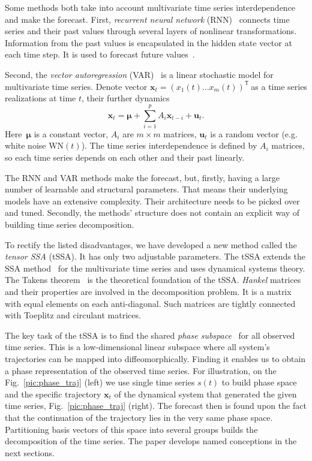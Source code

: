 \documentclass[referee, pdflatex, sn-mathphys-num]{sn-jnl}
\theoremstyle{definition}
\theoremstyle{plain}
\begin{document}
	Some methods both take into account multivariate time series interdependence and make the forecast. First, \emph{recurrent neural network} (RNN)~\cite{neco} connects time series and their past values through several layers of nonlinear transformations. Information from the past values is encapsulated in the hidden state vector at each time step. It is used to forecast future values~\cite{TEALAB2018334}.
	
	Second, the	\emph{vector autoregression} (VAR)~\cite{VAR_model1, doi:10.1080/01621459.1962.10480664} is a linear stochastic model for multivariate time series. Denote vector $ \mathbf{x}_t = (x_1(t) \ldots x_m(t))^{\mathsf{T}}~$as a time series realizations at time $ t $, their further dynamics	\begin{equation*}
		\mathbf{x}_t = \boldsymbol{\mu} + \sum\limits_{i = 1}^p A_i \mathbf{x}_{t - i} + \mathbf{u}_t.
	\end{equation*} Here~$\boldsymbol{\mu} $ is a constant vector, $A_i$ are $m \times m $ matrices, $ \mathbf{u}_t $ is a random vector (e.g. white noise $ \text{WN}(t) $). The time series interdependence is defined by $ A_i $ matrices, so each time series depends on each other and their past linearly.
	
	The RNN and VAR methods make the forecast, but, firstly, having a large number of learnable and structural parameters. That means their underlying models have an extensive complexity. Their architecture needs to be picked over and tuned. Secondly, the methods' structure does not contain an explicit way of building time series decomposition.
	
	To rectify the listed disadvantages, we have developed a new method called the \emph{tensor SSA} (tSSA). It has only two adjustable parameters. The tSSA extends the SSA method~\cite{ecfb9dc578be43ae9ee8fc88b8ff9151} for the multivariate time series and uses dynamical systems theory. The Takens theorem~\cite{citeulike:2735031} is the theoretical foundation of the tSSA. \emph{Hankel} matrices and their properties are involved in the decomposition problem. It is a matrix with equal elements on each anti-diagonal. Such matrices are tightly connected with Toeplitz and circulant matrices.
	
	The key task of the tSSA is to find the shared \emph{phase subspace}~\cite{1572261550523548160, ignatov2016human} for all observed time series. This is a low-dimensional linear subspace where all system's trajectories can be mapped into diffeomorphically. Finding it enables us to obtain a phase representation of the observed time series. For illustration, on the Fig.~\ref{pic:phase_traj} (left) we use single time series $ s(t) $ to build phase space and the specific trajectory $ \mathbf{x}_t $ of the dynamical system that generated the given time series, Fig.~\ref{pic:phase_traj} (right). The forecast then is found upon the fact that the continuation of the trajectory lies in the very same phase space. Partitioning basis vectors of this space into several groups builds the decomposition of the time series. The paper develops named conceptions in the next sections.
	
\end{document}
